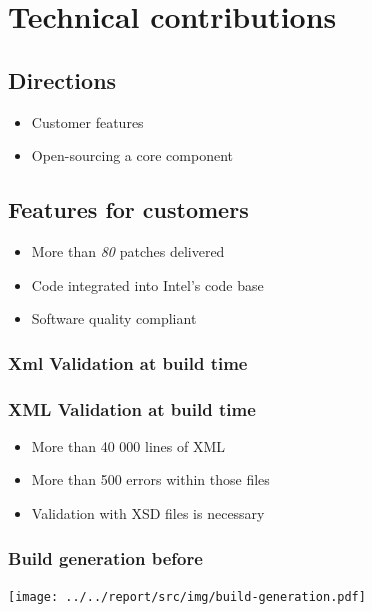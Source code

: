 %
%

\section{Technical contributions}
\subsection{Directions}
\begin{FrameWithSubSection}
    \begin{itemize}
        \item Customer features
        \item Open-sourcing a core component
    \end{itemize}
\end{FrameWithSubSection}


\subsection{Features for customers}
\begin{FrameWithSubSection}
    \begin{itemize}
        \item More than \emph{80} patches delivered
        \item Code integrated into Intel's code base
        \item Software quality compliant
    \end{itemize}
\end{FrameWithSubSection}

\subsubsection{Xml Validation at build time}
\begin{frame}
    \frametitle{XML Validation at build time}
    \begin{itemize}
        \item More than 40 000 lines of XML
        \item More than 500 errors within those files
        \item Validation with XSD files is necessary
    \end{itemize}
\end{frame}

\begin{frame}
    \frametitle{Build generation before}
        \centering
        \texttt{[image: ../../report/src/img/build-generation.pdf]}
\end{frame}

